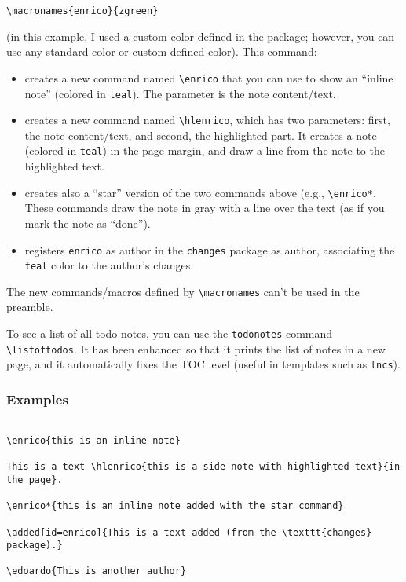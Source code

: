 \documentclass[a4paper]{article}
\newcommand\B[1]{\texttt{\textbackslash #1}}
\begin{document}
\begin{verbatim}
\macronames{enrico}{zgreen}
\end{verbatim}

(in this example, I used a custom color defined in the package; however, you can use any standard color or custom defined color). This command:

\begin{itemize}
    \item creates a new command named \B{enrico} that you can use to show an ``inline note'' (colored in \texttt{teal}). The parameter is the note content/text.
    \item creates a new command named \B{hlenrico}, which has two parameters: first, the note content/text, and second, the highlighted part. It creates a note (colored in \texttt{teal}) in the page margin, and draw a line from the note to the highlighted text.
    \item creates also a ``star'' version of the two commands above (e.g., \B{enrico*}. These commands draw the note in gray with a line over the text (as if you mark the note as ``done'').
    \item registers \texttt{enrico} as author in the \texttt{changes} package as author, associating the \texttt{teal} color to the author's changes.
\end{itemize}

The new commands/macros defined by \B{macronames} can't be used in the preamble.

To see a list of all todo notes, you can use the \texttt{todonotes} command \B{listoftodos}. It has been enhanced so that it prints the list of notes in a new page, and it automatically fixes the TOC level (useful in templates such as \texttt{lncs}).

\subsubsection{Examples}

\begin{verbatim}

\enrico{this is an inline note}

This is a text \hlenrico{this is a side note with highlighted text}{in the page}.

\enrico*{this is an inline note added with the star command}

\added[id=enrico]{This is a text added (from the \texttt{changes} package).}

\edoardo{This is another author}

\end{verbatim}
\end{document}
